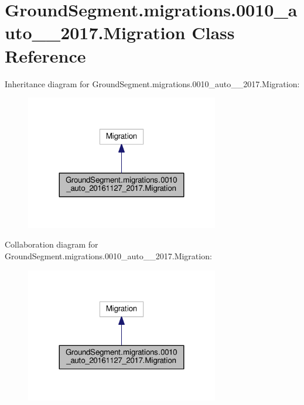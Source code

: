 \hypertarget{class_ground_segment_1_1migrations_1_10010__auto__20161127__2017_1_1_migration}{}\section{Ground\+Segment.\+migrations.0010\+\_\+auto\+\_\+\_\+2017.Migration Class Reference}
\label{class_ground_segment_1_1migrations_1_10010__auto__20161127__2017_1_1_migration}


Inheritance diagram for Ground\+Segment.\+migrations.0010\+\_\+auto\+\_\+\_\+2017.Migration\+:\nopagebreak
\begin{figure}[H]
\begin{center}
\leavevmode
\includegraphics[width=239pt]{class_ground_segment_1_1migrations_1_10010__auto__20161127__2017_1_1_migration__inherit__graph}
\end{center}
\end{figure}


Collaboration diagram for Ground\+Segment.\+migrations.0010\+\_\+auto\+\_\+\_\+2017.Migration\+:\nopagebreak
\begin{figure}[H]
\begin{center}
\leavevmode
\includegraphics[width=239pt]{class_ground_segment_1_1migrations_1_10010__auto__20161127__2017_1_1_migration__coll__graph}
\end{center}
\end{figure}

